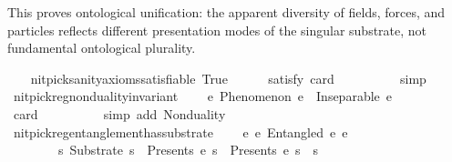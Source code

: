 \begin{isabellebody}
\begin{isamarkuptext}
  This proves ontological unification: the apparent diversity of fields, forces,
  and particles reflects different presentation modes of the singular substrate,
  not fundamental ontological plurality.%
\end{isamarkuptext}\isamarkuptrue%
%
\isadelimdocument
%
\endisadelimdocument
%
\isatagdocument
%
\isamarkuptrue%
%
\endisatagdocument
{\isafolddocument}%
%
\isadelimdocument
%
\endisadelimdocument
\ \ \isamarkupfalse%
\ nitpick{\isacharunderscore}{\kern0pt}sanity{\isacharunderscore}{\kern0pt}axioms{\isacharunderscore}{\kern0pt}satisfiable{\isacharcolon}{\kern0pt}\ True\isanewline
\ \ \ \ \isamarkupfalse%
\ {\isacharbrackleft}{\kern0pt}satisfy{\isacharcomma}{\kern0pt}\ card\ {\isacharequal}{\kern0pt}\ {}{\isacharcomma}{\kern0pt}{}{\isacharbrackright}{\kern0pt}\ \ \isanewline
%
\isadelimproof
\ \ \ \ %
\endisadelimproof
%
\isatagproof
{}\isamarkupfalse%
\ simp%
\endisatagproof
{\isafoldproof}%
%
\isadelimproof
%
\endisadelimproof
\isanewline
\isanewline
\ \ \isanewline
\ \ \isamarkupfalse%
\ nitpick{\isacharunderscore}{\kern0pt}reg{\isacharunderscore}{\kern0pt}nonduality{\isacharunderscore}{\kern0pt}invariant{\isacharcolon}{\kern0pt}\isanewline
\ \ \ \ {\isachardoublequoteopen}{\isasymforall}e{\isachardot}{\kern0pt}\ Phenomenon\ e\ {\isasymlongrightarrow}\ Inseparable\ e\ {\isasymOmega}{\isachardoublequoteclose}\isanewline
\ \ \ \ \isamarkupfalse%
\ {\isacharbrackleft}{\kern0pt}card\ {\isacharequal}{\kern0pt}\ {}{\isacharbrackright}{\kern0pt}\ \ \isanewline
%
\isadelimproof
\ \ \ \ %
\endisadelimproof
%
\isatagproof
{}\isamarkupfalse%
\ {\isacharparenleft}{\kern0pt}simp\ add{\isacharcolon}{\kern0pt}\ Nonduality{\isacharparenright}{\kern0pt}%
\endisatagproof
{\isafoldproof}%
%
\isadelimproof
%
\endisadelimproof
\isanewline
\isanewline
\ \ \isanewline
\ \ \isamarkupfalse%
\ nitpick{\isacharunderscore}{\kern0pt}reg{\isacharunderscore}{\kern0pt}entanglement{\isacharunderscore}{\kern0pt}has{\isacharunderscore}{\kern0pt}substrate{\isacharcolon}{\kern0pt}\isanewline
\ \ \ \ {\isachardoublequoteopen}{\isasymforall}e{}\ e{}{\isachardot}{\kern0pt}\ Entangled\ e{}\ e{}\ {\isasymlongrightarrow}\isanewline
\ \ \ \ \ \ \ \ {\isacharparenleft}{\kern0pt}{\isasymexists}s{\isachardot}{\kern0pt}\ Substrate\ s\ {\isasymand}\ Presents\ e{}\ s\ {\isasymand}\ Presents\ e{}\ s\ {\isasymand}\ s\ {\isacharequal}{\kern0pt}\ {\isasymOmega}{\isacharparenright}{\kern0pt}{\isachardoublequoteclose}\isanewline

\end{isabellebody}
